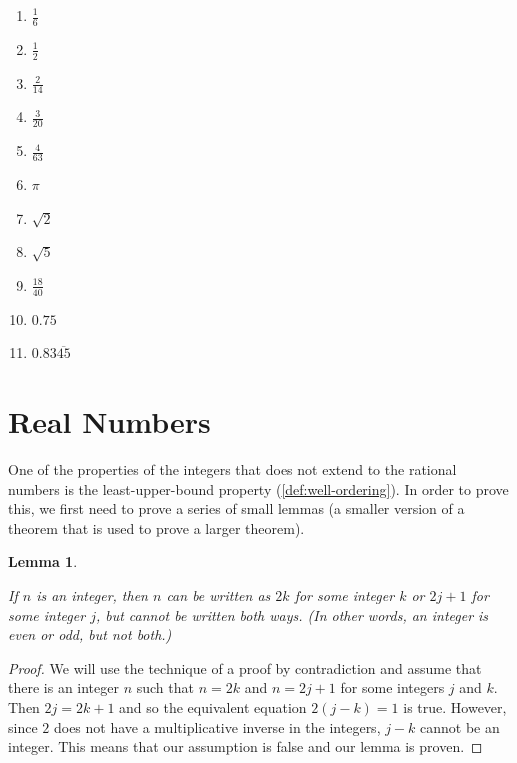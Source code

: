 \documentclass[
]{book}
\providecommand{\tightlist}{%
  \setlength{\itemsep}{0pt}\setlength{\parskip}{0pt}}
\newtheorem{lemma}{Lemma}[chapter]
\theoremstyle{definition}
\theoremstyle{definition}
\theoremstyle{definition}
\theoremstyle{definition}
\theoremstyle{remark}
\begin{document}
\begin{enumerate}
  \begin{enumerate}
  \def\labelenumii{\alph{enumii}.}
  \tightlist
  \item
    \(\frac{1}{6}\)
  \item
    \(\frac{1}{2}\)
  \item
    \(\frac{2}{14}\)
  \item
    \(\frac{3}{20}\)
  \item
    \(\frac{4}{63}\)
  \item
    \(\pi\)
  \item
    \(\sqrt{2}\)
  \item
    \(\sqrt{5}\)
  \item
    \(\frac{18}{40}\)
  \item
    \(0.75\)
  \item
    \(0.83\overline{45}\)
  \end{enumerate}
\end{enumerate}

\hypertarget{sec:reals}{%
\section{Real Numbers}\label{sec:reals}}

One of the properties of the integers that does not extend to the rational numbers is the least-upper-bound property (\ref{def:well-ordering}). In order to prove this, we first need to prove a series of small lemmas (a smaller version of a theorem that is used to prove a larger theorem).

\begin{lemma}
\protect\hypertarget{lem:unlabeled-div-46}{}\label{lem:unlabeled-div-46}

If \(n\) is an integer, then \(n\) can be written as \(2k\) for some integer \(k\) or \(2j+1\) for some integer \(j\), but cannot be written both ways. (In other words, an integer is even or odd, but not both.)

\end{lemma}

\begin{proof}

We will use the technique of a proof by contradiction and assume that there is an integer \(n\) such that \(n=2k\) and \(n=2j+1\) for some integers \(j\) and \(k\). Then \(2j=2k+1\) and so the equivalent equation \(2(j-k)=1\) is true. However, since \(2\) does not have a multiplicative inverse in the integers, \(j-k\) cannot be an integer. This means that our assumption is false and our lemma is proven.

\end{proof}
\end{document}
